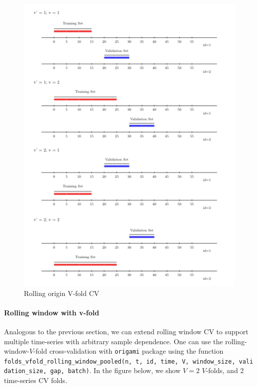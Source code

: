 \documentclass[12pt, krantz2,]{krantz}
\let\oldparagraph\paragraph
\renewcommand{\paragraph}[1]{\oldparagraph{#1}\mbox{}}
\theoremstyle{definition}
\theoremstyle{definition}
\theoremstyle{definition}
\newcommand{\1}{\mathbbm{1}}
\begin{document}
\begin{figure}

{\centering \includegraphics[width=0.8\linewidth]{img/image/rolling_origin_v_fold} 

}

\caption{Rolling origin V-fold CV}\label{fig:unnamed-chunk-3}
\end{figure}

\hypertarget{rolling-window-with-v-fold}{%
\paragraph{Rolling window with v-fold}\label{rolling-window-with-v-fold}}

Analogous to the previous section, we can extend rolling window CV to support
multiple time-series with arbitrary sample dependence. One can use the
rolling-window-\(V\)-fold cross-validation with \texttt{origami} package using the
function \texttt{folds\_vfold\_rolling\_window\_pooled(n,\ t,\ id,\ time,\ V,\ window\_size,\ validation\_size,\ gap,\ batch)}. In the figure below, we show \(V=2\) \(V\)-folds, and
2 time-series CV folds.
\end{document}
